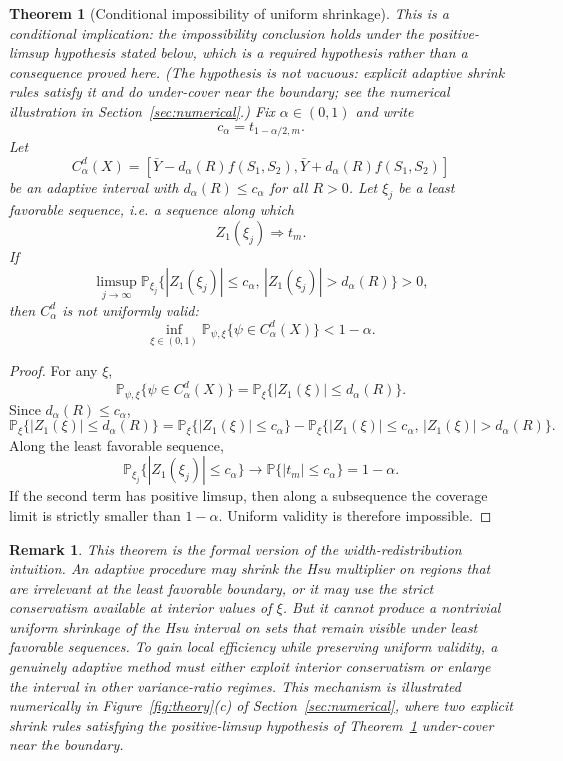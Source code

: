 \documentclass[12pt]{article}
\newtheorem{theorem}{Theorem}
\newtheorem{remark}{Remark}
\newcommand{\Prb}{\mathbb P}
\begin{document}
\begin{theorem}[Conditional impossibility of uniform shrinkage]
\label{thm:cond-shrink}
This is a \emph{conditional} implication: the impossibility conclusion holds
\emph{under} the positive-limsup hypothesis stated below, which is a required
hypothesis rather than a consequence proved here.  (The hypothesis is not
vacuous: explicit adaptive shrink rules satisfy it and do under-cover near the
boundary; see the numerical illustration in Section~\ref{sec:numerical}.)
Fix \(\alpha\in(0,1)\) and write
\[
c_\alpha=t_{1-\alpha/2,m}.
\]
Let
\[
C_\alpha^d(X)
=
\left[
\bar Y-d_\alpha(R)f(S_1,S_2),
\bar Y+d_\alpha(R)f(S_1,S_2)
\right]
\]
be an adaptive interval with \(d_\alpha(R)\leq c_\alpha\) for all \(R>0\).
Let \(\xi_j\) be a least favorable sequence, i.e. a sequence along which
\[
Z_1(\xi_j)\Rightarrow t_m.
\]
If
\[
\limsup_{j\to\infty}
\Prb_{\xi_j}\{|Z_1(\xi_j)|\leq c_\alpha,\,
              |Z_1(\xi_j)|>d_\alpha(R)\}
>0,
\]
then \(C_\alpha^d\) is not uniformly valid:
\[
\inf_{\xi\in(0,1)}
\Prb_{\psi,\xi}\{\psi\in C_\alpha^d(X)\}
<1-\alpha.
\]
\end{theorem}

\begin{proof}
For any \(\xi\),
\[
\Prb_{\psi,\xi}\{\psi\in C_\alpha^d(X)\}
=
\Prb_\xi\{|Z_1(\xi)|\leq d_\alpha(R)\}.
\]
Since \(d_\alpha(R)\leq c_\alpha\),
\[
\Prb_\xi\{|Z_1(\xi)|\leq d_\alpha(R)\}
=
\Prb_\xi\{|Z_1(\xi)|\leq c_\alpha\}
-
\Prb_\xi\{|Z_1(\xi)|\leq c_\alpha,\,
          |Z_1(\xi)|>d_\alpha(R)\}.
\]
Along the least favorable sequence,
\[
\Prb_{\xi_j}\{|Z_1(\xi_j)|\leq c_\alpha\}
\to
\Prb\{|t_m|\leq c_\alpha\}
=1-\alpha.
\]
If the second term has positive limsup, then along a subsequence the coverage
limit is strictly smaller than \(1-\alpha\).  Uniform validity is therefore
impossible.
\end{proof}

\begin{remark}
This theorem is the formal version of the width-redistribution intuition.
An adaptive procedure may shrink the Hsu multiplier on regions that are
irrelevant at the least favorable boundary, or it may use the strict
conservatism available at interior values of \(\xi\).  But it cannot produce a
nontrivial uniform shrinkage of the Hsu interval on sets that remain visible
under least favorable sequences.  To gain local efficiency while preserving
uniform validity, a genuinely adaptive method must either exploit interior
conservatism or enlarge the interval in other variance-ratio regimes.  This
mechanism is illustrated numerically in Figure~\ref{fig:theory}(c) of
Section~\ref{sec:numerical}, where two explicit shrink rules satisfying the
positive-limsup hypothesis of Theorem~\ref{thm:cond-shrink} under-cover near
the boundary.
\end{remark}
\end{document}
